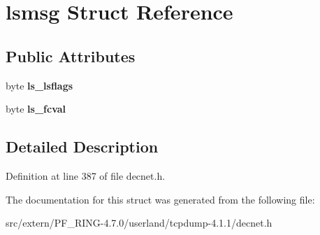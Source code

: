 \hypertarget{structlsmsg}{
\section{lsmsg Struct Reference}
\label{structlsmsg}
}
\subsection*{Public Attributes}
\begin{DoxyCompactItemize}
\item 
\hypertarget{structlsmsg_a43a6352c691b404ac50be0a0172a4224}{
byte {\bfseries ls\_\-lsflags}}
\label{structlsmsg_a43a6352c691b404ac50be0a0172a4224}

\item 
\hypertarget{structlsmsg_a4d6d2328f2a3b03edde3526e5c76f3cc}{
byte {\bfseries ls\_\-fcval}}
\label{structlsmsg_a4d6d2328f2a3b03edde3526e5c76f3cc}

\end{DoxyCompactItemize}


\subsection{Detailed Description}


Definition at line 387 of file decnet.h.



The documentation for this struct was generated from the following file:\begin{DoxyCompactItemize}
\item 
src/extern/PF\_\-RING-\/4.7.0/userland/tcpdump-\/4.1.1/decnet.h\end{DoxyCompactItemize}
